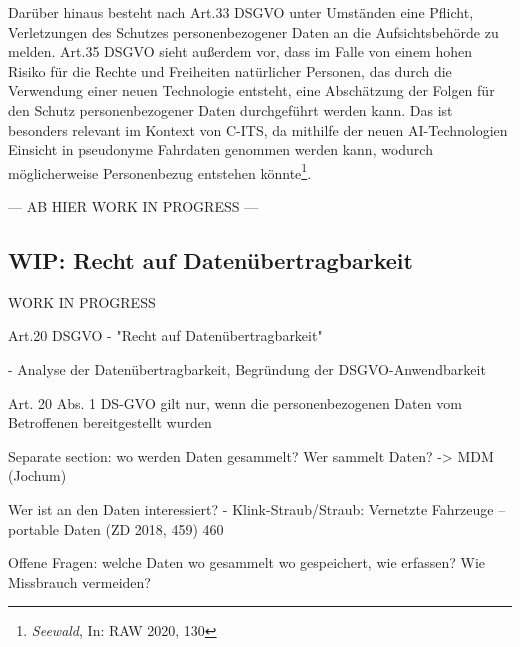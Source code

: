 Darüber hinaus besteht nach Art.33 DSGVO unter Umständen eine Pflicht, Verletzungen des Schutzes personenbezogener Daten an die Aufsichtsbehörde zu melden. Art.35 DSGVO sieht außerdem vor, dass im Falle von einem hohen Risiko für die Rechte und Freiheiten natürlicher Personen, das durch die Verwendung einer neuen Technologie entsteht, eine Abschätzung der Folgen für den Schutz personenbezogener Daten durchgeführt werden kann. Das ist besonders relevant im Kontext von C-ITS, da mithilfe der neuen AI-Technologien Einsicht in pseudonyme Fahrdaten genommen werden kann, wodurch möglicherweise Personenbezug entstehen könnte\footnote{\emph{Seewald}, In: RAW 2020, 130}. 


--- AB HIER WORK IN PROGRESS ---


\subsection{WIP: Recht auf Datenübertragbarkeit}

WORK IN PROGRESS

Art.20 DSGVO - "Recht auf Datenübertragbarkeit"

\cite{Straub2018} - Analyse der Datenübertragbarkeit, Begründung der DSGVO-Anwendbarkeit

Art. 20 Abs. 1 DS-GVO gilt nur, wenn die personenbezogenen Daten vom Betroffenen bereitgestellt wurden

Separate section: wo werden Daten gesammelt? Wer sammelt Daten? 
-> MDM (Jochum)

Wer ist an den Daten interessiert? - Klink-Straub/Straub: Vernetzte Fahrzeuge – portable Daten (ZD 2018, 459) 460

Offene Fragen: welche Daten wo gesammelt wo gespeichert, wie erfassen? Wie Missbrauch vermeiden?




